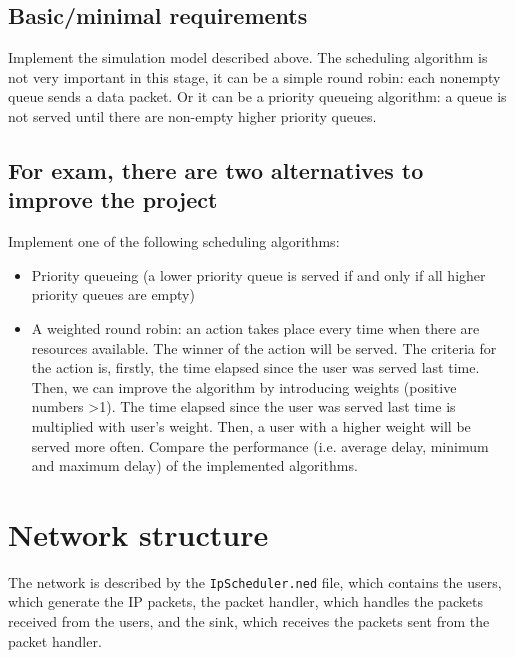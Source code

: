 \documentclass[12pt]{article}
\begin{document}
        \subsection*{Basic/minimal requirements}
        Implement the simulation model described above. The scheduling algorithm is not very important in this stage, it can be a simple round robin: each nonempty queue sends a data packet. Or it can be a priority queueing algorithm: a queue is not served until there are non-empty higher priority queues.

        \subsection*{For exam, there are two alternatives to improve the project}
        Implement one of the following scheduling algorithms:
        \begin{itemize}
            \item{Priority queueing (a lower priority queue is served if and only if all higher priority queues are empty)}
            \item{A weighted round robin: an action takes place every time when there are resources available. The winner of the action will be served. The criteria for the action is, firstly, the time elapsed since the user was served last time. Then, we can improve the algorithm by introducing weights (positive numbers >1). The time elapsed since the user was served last time is multiplied with user's weight. Then, a user with a higher weight will be served more often. Compare the performance (i.e. average delay, minimum and maximum delay) of the implemented algorithms.}
        \end{itemize}

    \section{Network structure}
    The network is described by the \verb|IpScheduler.ned| file, which contains the users, which generate the IP packets, the packet handler, which handles the packets received from the users, and the sink, which receives the packets sent from the packet handler.
\end{document}
